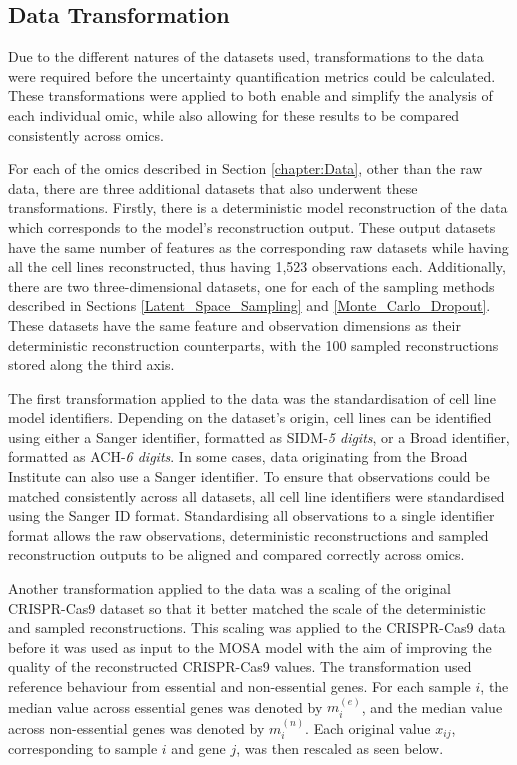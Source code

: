 \subsection{Data Transformation} \label{chapter:Data_transformation}

Due to the different natures of the datasets used, transformations to the data were required before the uncertainty quantification metrics could be calculated. These transformations were applied to both enable and simplify the analysis of each individual omic, while also allowing for these results to be compared consistently across omics. 

For each of the omics described in Section \ref{chapter:Data}, other than the raw data, there are three additional datasets that also underwent these transformations. Firstly, there is a deterministic model reconstruction of the data which corresponds to the model's reconstruction output. These output datasets have the same number of features as the corresponding raw datasets while having all the cell lines reconstructed, thus having 1,523 observations each. Additionally, there are two three-dimensional datasets, one for each of the sampling methods described in Sections \ref{Latent_Space_Sampling} and \ref{Monte_Carlo_Dropout}. These datasets have the same feature and observation dimensions as their deterministic reconstruction counterparts, with the 100 sampled reconstructions stored along the third axis. 

The first transformation applied to the data was the standardisation of cell line model identifiers. Depending on the dataset's origin, cell lines can be identified using either a Sanger identifier, formatted as SIDM-\textit{5 digits}, or a Broad identifier, formatted as ACH-\textit{6 digits}. In some cases, data originating from the Broad Institute can also use a Sanger identifier. To ensure that observations could be matched consistently across all datasets, all cell line identifiers were standardised using the Sanger ID format. Standardising all observations to a single identifier format allows the raw observations, deterministic reconstructions and sampled reconstruction outputs to be aligned and compared correctly across omics.

Another transformation applied to the data was a scaling of the original CRISPR-Cas9 dataset so that it better matched the scale of the deterministic and sampled reconstructions. This scaling was applied to the CRISPR-Cas9 data before it was used as input to the \gls{MOSA} model with the aim of improving the quality of the reconstructed CRISPR-Cas9 values. The transformation used reference behaviour from essential and non-essential genes. For each sample $i$, the median value across essential genes was denoted by $m^{(e)}_i$, and the median value across non-essential genes was denoted by $m^{(n)}_i$. Each original value $x_{ij}$, corresponding to sample $i$ and gene $j$, was then rescaled as seen below.

